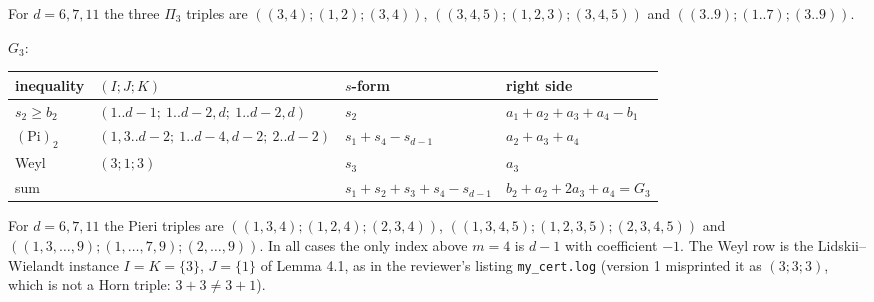 \documentclass[
  11pt,
  a4paper,
]{article}
\newcounter{none} %
\begin{document}
For \(d=6,\allowbreak{}7,\allowbreak{}11\) the three \(\Pi_3\) triples are
\(((3,\allowbreak{}4);\allowbreak{}(1,\allowbreak{}2);\allowbreak{}(3,\allowbreak{}4))\), \(((3,\allowbreak{}4,\allowbreak{}5);\allowbreak{}(1,\allowbreak{}2,\allowbreak{}3);\allowbreak{}(3,\allowbreak{}4,\allowbreak{}5))\) and
\(((3..9);\allowbreak{}(1..7);\allowbreak{}(3..9))\).

\(G_3\):

{\def\LTcaptype{none} %
\begin{longtable}[]{@{}
  >{\raggedright\arraybackslash}p{}
  >{\raggedright\arraybackslash}p{}
  >{\raggedright\arraybackslash}p{}
  >{\raggedright\arraybackslash}p{}@{}}
\toprule\noalign{}
\begin{minipage}[b]{\linewidth}\raggedright
inequality
\end{minipage} & \begin{minipage}[b]{\linewidth}\raggedright
\((I;\allowbreak{}J;\allowbreak{}K)\)
\end{minipage} & \begin{minipage}[b]{\linewidth}\raggedright
\(s\)-form
\end{minipage} & \begin{minipage}[b]{\linewidth}\raggedright
right side
\end{minipage} \\
\midrule\noalign{}
\endhead
\bottomrule\noalign{}
\endlastfoot
\(s_2\ge b_2\) & \((1..d{-}1;\allowbreak{}\ 1..d{-}2,\allowbreak{}d;\allowbreak{}\ 1..d{-}2,\allowbreak{}d)\) & \(s_2\) &
\(a_1+a_2+a_3+a_4-b_1\) \\
\((\mathrm{Pi})_2\) & \((1,\allowbreak{}3..d{-}2;\allowbreak{}\ 1..d{-}4,\allowbreak{}d{-}2;\allowbreak{}\ 2..d{-}2)\) &
\(s_1+s_4-s_{d-1}\) & \(a_2+a_3+a_4\) \\
Weyl & \((3;\allowbreak{}1;\allowbreak{}3)\) & \(s_3\) & \(a_3\) \\
sum & & \(s_1+s_2+s_3+s_4-s_{d-1}\) & \(b_2+a_2+2a_3+a_4=G_3\) \\
\end{longtable}
}

For \(d=6,\allowbreak{}7,\allowbreak{}11\) the Pieri triples are \(((1,\allowbreak{}3,\allowbreak{}4);\allowbreak{}(1,\allowbreak{}2,\allowbreak{}4);\allowbreak{}(2,\allowbreak{}3,\allowbreak{}4))\),
\(((1,\allowbreak{}3,\allowbreak{}4,\allowbreak{}5);\allowbreak{}(1,\allowbreak{}2,\allowbreak{}3,\allowbreak{}5);\allowbreak{}(2,\allowbreak{}3,\allowbreak{}4,\allowbreak{}5))\) and
\(((1,\allowbreak{}3,\allowbreak{}\dots,\allowbreak{}9);\allowbreak{}(1,\allowbreak{}\dots,\allowbreak{}7,\allowbreak{}9);\allowbreak{}(2,\allowbreak{}\dots,\allowbreak{}9))\). In all cases the only
index above \(m=4\) is \(d-1\) with coefficient \(-1\). The Weyl row is
the Lidskii--Wielandt instance \(I=K=\{3\}\), \(J=\{1\}\) of Lemma 4.1,
as in the reviewer's listing {\small\texttt{my\_\allowbreak{}cert.\allowbreak{}log}} (version 1 misprinted
it as \((3;\allowbreak{}3;\allowbreak{}3)\), which is not a Horn triple: \(3+3\ne3+1\)).
\end{document}
